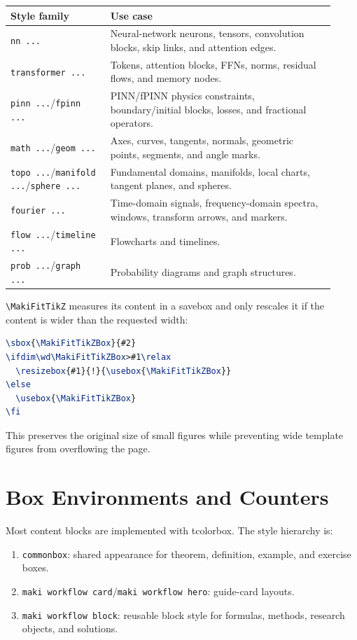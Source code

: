 \documentclass[a4paper,11pt]{ltxdoc}
\newcommand{\mpkg}[1]{\textsf{#1}}
\newcommand{\mcmd}[1]{\texttt{\textbackslash#1}}
\newcommand{\mkey}[1]{\texttt{#1}}
\begin{document}
\begin{longtable}{@{}p{0.29\linewidth}p{0.63\linewidth}@{}}
\toprule
Style family & Use case \\
\midrule
\mkey{nn ...} & Neural-network neurons, tensors, convolution blocks, skip links, and attention edges.\\
\mkey{transformer ...} & Tokens, attention blocks, FFNs, norms, residual flows, and memory nodes.\\
\mkey{pinn ...}/\mkey{fpinn ...} & PINN/fPINN physics constraints, boundary/initial blocks, losses, and fractional operators.\\
\mkey{math ...}/\mkey{geom ...} & Axes, curves, tangents, normals, geometric points, segments, and angle marks.\\
\mkey{topo ...}/\mkey{manifold ...}/\mkey{sphere ...} & Fundamental domains, manifolds, local charts, tangent planes, and spheres.\\
\mkey{fourier ...} & Time-domain signals, frequency-domain spectra, windows, transform arrows, and markers.\\
\mkey{flow ...}/\mkey{timeline ...} & Flowcharts and timelines.\\
\mkey{prob ...}/\mkey{graph ...} & Probability diagrams and graph structures.\\
\bottomrule
\end{longtable}

\mcmd{MakiFitTikZ} measures its content in a savebox and only rescales it if the
content is wider than the requested width:

\begin{lstlisting}[language=TeX]
\sbox{\MakiFitTikZBox}{#2}
\ifdim\wd\MakiFitTikZBox>#1\relax
  \resizebox{#1}{!}{\usebox{\MakiFitTikZBox}}
\else
  \usebox{\MakiFitTikZBox}
\fi
\end{lstlisting}

This preserves the original size of small figures while preventing wide template
figures from overflowing the page.

\section{Box Environments and Counters}

Most content blocks are implemented with \mpkg{tcolorbox}. The style hierarchy is:

\begin{enumerate}
\item \mkey{commonbox}: shared appearance for theorem, definition, example, and exercise boxes.
\item \mkey{maki workflow card}/\mkey{maki workflow hero}: guide-card layouts.
\item \mkey{maki workflow block}: reusable block style for formulas, methods, research objects, and solutions.
\end{enumerate}
\end{document}

